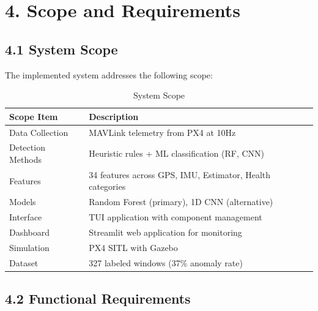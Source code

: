 \section{4. Scope and Requirements}

\subsection{4.1 System Scope}

The implemented system addresses the following scope:

\begin{table}[htbp]
    \centering
    \caption{System Scope}
    \label{tab:scope}
    \begin{tabular}{|p{3cm}|p{12cm}|}
        \hline
        \textbf{Scope Item} & \textbf{Description} \\
        \hline
        Data Collection & MAVLink telemetry from PX4 at 10Hz \\
        \hline
        Detection Methods & Heuristic rules + ML classification (RF, CNN) \\
        \hline
        Features & 34 features across GPS, IMU, Estimator, Health categories \\
        \hline
        Models & Random Forest (primary), 1D CNN (alternative) \\
        \hline
        Interface & TUI application with component management \\
        \hline
        Dashboard & Streamlit web application for monitoring \\
        \hline
        Simulation & PX4 SITL with Gazebo \\
        \hline
        Dataset & 327 labeled windows (37\% anomaly rate) \\
        \hline
    \end{tabular}
\end{table}

\subsection{4.2 Functional Requirements}

